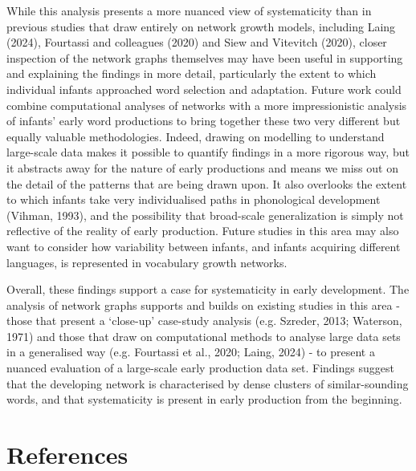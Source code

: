 \documentclass[
  man]{apa6}
\begin{document}
While this analysis presents a more nuanced view of systematicity than in previous studies that draw entirely on network growth models, including Laing (2024), Fourtassi and colleagues (2020) and Siew and Vitevitch (2020), closer inspection of the network graphs themselves may have been useful in supporting and explaining the findings in more detail, particularly the extent to which individual infants approached word selection and adaptation. Future work could combine computational analyses of networks with a more impressionistic analysis of infants' early word productions to bring together these two very different but equally valuable methodologies. Indeed, drawing on modelling to understand large-scale data makes it possible to quantify findings in a more rigorous way, but it abstracts away for the nature of early productions and means we miss out on the detail of the patterns that are being drawn upon. It also overlooks the extent to which infants take very individualised paths in phonological development (Vihman, 1993), and the possibility that broad-scale generalization is simply not reflective of the reality of early production. Future studies in this area may also want to consider how variability between infants, and infants acquiring different languages, is represented in vocabulary growth networks.

Overall, these findings support a case for systematicity in early development. The analysis of network graphs supports and builds on existing studies in this area - those that present a `close-up' case-study analysis (e.g. Szreder, 2013; Waterson, 1971) and those that draw on computational methods to analyse large data sets in a generalised way (e.g. Fourtassi et al., 2020; Laing, 2024) - to present a nuanced evaluation of a large-scale early production data set. Findings suggest that the developing network is characterised by dense clusters of similar-sounding words, and that systematicity is present in early production from the beginning.
\newpage

\section*{References}\label{references}
\end{document}

